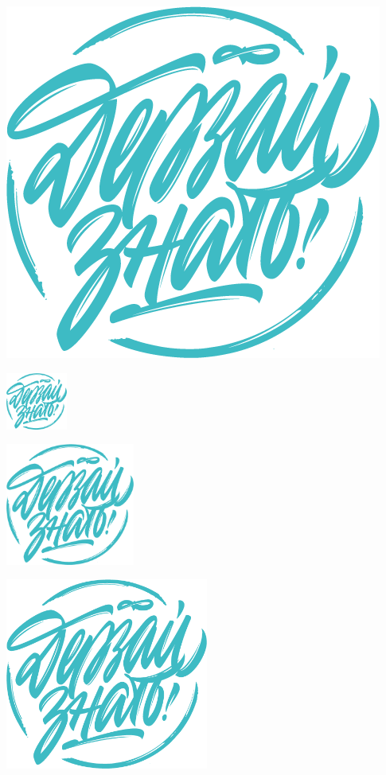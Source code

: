 \documentclass[a4paper,12pt]{article} %
\begin{document}
\includegraphics[scale=0.3]{dz_rastr}

\includegraphics[width=2cm]{dz_rastr}

\includegraphics[height=4cm]{dz_rastr}

\includegraphics[width=0.5\textwidth]{dz_rastr}
\end{document}
